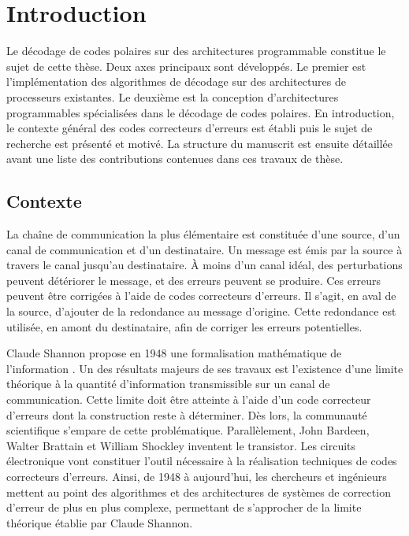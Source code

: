 \chapter*{Introduction}

Le décodage de codes polaires sur des architectures programmable constitue le sujet de cette thèse. Deux axes principaux sont développés. Le premier est l'implémentation des algorithmes de décodage sur des architectures de processeurs existantes. Le deuxième est la conception d'architectures programmables spécialisées dans le décodage de codes polaires. En introduction, le contexte général des codes correcteurs d'erreurs est établi puis le sujet de recherche est présenté et motivé. La structure du manuscrit est ensuite détaillée avant une liste des contributions contenues dans ces travaux de thèse.

\section*{Contexte}

La chaîne de communication la plus élémentaire est constituée d'une source, d'un canal de communication et d'un destinataire. Un message est émis par la source à travers le canal jusqu'au destinataire. \`A moins d'un canal idéal, des perturbations peuvent détériorer le message, et des erreurs peuvent se produire. Ces erreurs peuvent être corrigées à l'aide de codes correcteurs d'erreurs. Il s'agit, en aval de la source, d'ajouter de la redondance au message d'origine. Cette redondance est utilisée, en amont du destinataire, afin de corriger les erreurs potentielles.

Claude Shannon propose en 1948 une formalisation mathématique de l'information \cite{shannon_mathematical_2001}. Un des résultats majeurs de ses travaux est l’existence d'une limite théorique à la quantité d'information transmissible sur un canal de communication. Cette limite doit être atteinte à l'aide d'un code correcteur d'erreurs dont la construction reste à déterminer.
Dès lors, la communauté scientifique s'empare de cette problématique.
Parallèlement, John Bardeen, Walter Brattain et William Shockley inventent le transistor. Les circuits électronique vont constituer l'outil nécessaire à la réalisation techniques de codes correcteurs d'erreurs. Ainsi, de 1948 à aujourd'hui, les chercheurs et ingénieurs mettent au point des algorithmes et des architectures de systèmes de correction d'erreur de plus en plus complexe, permettant de s'approcher de la limite théorique établie par Claude Shannon.

